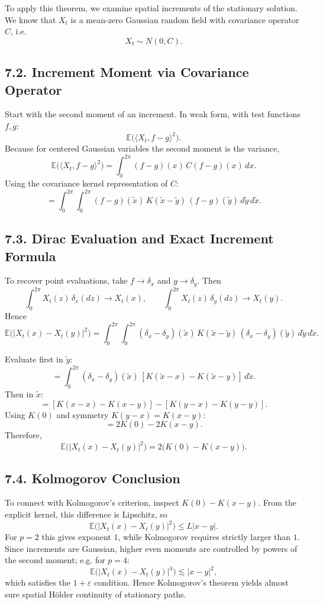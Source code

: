\documentclass[11pt]{article}
\theoremstyle{definition}
\theoremstyle{remark}
\begin{document}
To apply this theorem, we examine spatial increments of the stationary solution. We know that $X_t$ is a mean-zero Gaussian random field with covariance operator $C$, i.e.
\[
X_t\sim N(0,C).
\]

\subsection*{7.2. Increment Moment via Covariance Operator}
Start with the second moment of an increment. In weak form, with test functions $f,g$:
\[
\mathbb E\bigl(\langle X_t,f-g\rangle^2\bigr).
\]
Because for centered Gaussian variables the second moment is the variance,
\[
\mathbb E\bigl(\langle X_t,f-g\rangle^2\bigr)
=
\int_0^{2\pi}(f-g)(x)\,C(f-g)(x)\,dx.
\]
Using the covariance kernel representation of $C$:
\[
=
\int_0^{2\pi}\!\!\int_0^{2\pi}
(f-g)(\tilde x)\,K(\tilde x-\tilde y)\,(f-g)(\tilde y)\,d\tilde y\,d\tilde x.
\]

\subsection*{7.3. Dirac Evaluation and Exact Increment Formula}
To recover point evaluations, take $f\to\delta_x$ and $g\to\delta_y$. Then
\[
\int_0^{2\pi}X_t(z)\,\delta_x(dz)\to X_t(x),
\qquad
\int_0^{2\pi}X_t(z)\,\delta_y(dz)\to X_t(y).
\]
Hence
\[
\mathbb E\bigl(|X_t(x)-X_t(y)|^2\bigr)
=
\int_0^{2\pi}\!\!\int_0^{2\pi}
(\delta_x-\delta_y)(\tilde x)\,K(\tilde x-\tilde y)\,(\delta_x-\delta_y)(\tilde y)\,d\tilde y\,d\tilde x.
\]

Evaluate first in $\tilde y$:
\[
=
\int_0^{2\pi}
(\delta_x-\delta_y)(\tilde x)\,[K(\tilde x-x)-K(\tilde x-y)]\,d\tilde x.
\]
Then in $\tilde x$:
\[
=[K(x-x)-K(x-y)]-[K(y-x)-K(y-y)].
\]
Using $K(0)$ and symmetry $K(y-x)=K(x-y)$:
\[
=2K(0)-2K(x-y).
\]
Therefore,
\[
\mathbb E\bigl(|X_t(x)-X_t(y)|^2\bigr)
=
2\bigl(K(0)-K(x-y)\bigr).
\]

\subsection*{7.4. Kolmogorov Conclusion}
To connect with Kolmogorov's criterion, inspect $K(0)-K(x-y)$. From the explicit kernel, this difference is Lipschitz, so
\[
\mathbb E\bigl(|X_t(x)-X_t(y)|^2\bigr)\le L|x-y|.
\]
For $p=2$ this gives exponent $1$, while Kolmogorov requires strictly larger than $1$. Since increments are Gaussian, higher even moments are controlled by powers of the second moment; e.g. for $p=4$:
\[
\mathbb E\bigl(|X_t(x)-X_t(y)|^4\bigr)\lesssim |x-y|^2,
\]
which satisfies the $1+\varepsilon$ condition. Hence Kolmogorov's theorem yields almost sure spatial H\"older continuity of stationary paths.
\end{document}
